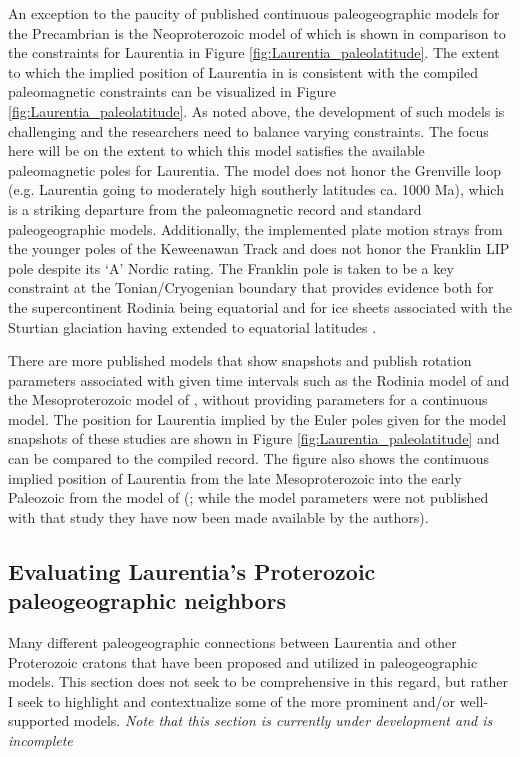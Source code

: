 \documentclass[11pt,letterpaper]{article}
\begin{document}
An exception to the paucity of published continuous paleogeographic models for the Precambrian is the Neoproterozoic model of \cite{Merdith2017b} which is shown in comparison to the constraints for Laurentia in Figure \ref{fig:Laurentia_paleolatitude}. The extent to which the implied position of Laurentia in \cite{Merdith2017b} is consistent with the compiled paleomagnetic constraints can be visualized in Figure \ref{fig:Laurentia_paleolatitude}. As noted above, the development of such models is challenging and the researchers need to balance varying constraints. The focus here will be on the extent to which this model satisfies the available paleomagnetic poles for Laurentia. The model does not honor the Grenville loop (e.g. Laurentia going to moderately high southerly latitudes ca. 1000 Ma), which is a striking departure from the paleomagnetic record and standard paleogeographic models. Additionally, the implemented plate motion strays from the younger poles of the Keweenawan Track and does not honor the Franklin LIP pole \cite{Denyszyn2009b} despite its `A' Nordic rating. The Franklin pole is taken to be a key constraint at the Tonian/Cryogenian boundary that provides evidence both for the supercontinent Rodinia being equatorial and for ice sheets associated with the Sturtian glaciation having extended to equatorial latitudes \citep{Macdonald2010a}.

There are more published models that show snapshots and publish rotation parameters associated with given time intervals such as the Rodinia model of \cite{Li2008a} and the Mesoproterozoic model of \cite{Pisarevsky2014b}, without providing parameters for a continuous model. The position for Laurentia implied by the Euler poles given for the model snapshots of these studies are shown in Figure \ref{fig:Laurentia_paleolatitude} and can be compared to the compiled record. The figure also shows the continuous implied position of Laurentia from the late Mesoproterozoic into the early Paleozoic from the model of (\citealp{Li2013a}; while the model parameters were not published with that study they have now been made available by the authors).

\subsection{Evaluating Laurentia's Proterozoic paleogeographic neighbors}
Many different paleogeographic connections between Laurentia and other Proterozoic cratons that have been proposed and utilized in paleogeographic models. This section does not seek to be comprehensive in this regard, but rather I seek to highlight and contextualize some of the more prominent and/or well-supported models.
\textit{Note that this section is currently under development and is incomplete}
\end{document}
